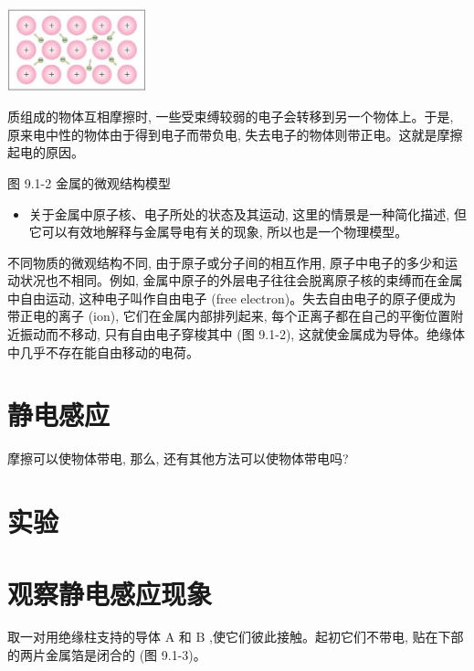 \documentclass[10pt]{article}
\begin{document}
\begin{mdframed}

\begin{center}
\includegraphics[max width=0.3\textwidth]{images/01911d5f-8e38-70c0-b5b8-2b399bd115b6_8_950329.jpg}
\end{center}

质组成的物体互相摩擦时, 一些受束缚较弱的电子会转移到另一个物体上。于是, 原来电中性的物体由于得到电子而带负电, 失去电子的物体则带正电。这就是摩擦起电的原因。

图 9.1-2 金属的微观结构模型

\begin{itemize}
\item 关于金属中原子核、电子所处的状态及其运动, 这里的情景是一种简化描述, 但它可以有效地解释与金属导电有关的现象, 所以也是一个物理模型。
\end{itemize}

\end{mdframed}

不同物质的微观结构不同, 由于原子或分子间的相互作用, 原子中电子的多少和运动状况也不相同。例如, 金属中原子的外层电子往往会脱离原子核的束缚而在金属中自由运动, 这种电子叫作自由电子 (free electron)。失去自由电子的原子便成为带正电的离子 (ion), 它们在金属内部排列起来, 每个正离子都在自己的平衡位置附近振动而不移动, 只有自由电子穿梭其中 (图 9.1-2), 这就使金属成为导体。绝缘体中几乎不存在能自由移动的电荷。

\section*{静电感应}

摩擦可以使物体带电, 那么, 还有其他方法可以使物体带电吗?

\section*{实验}

\section*{观察静电感应现象}

取一对用绝缘柱支持的导体 \(\mathrm{A}\) 和 \(\mathrm{B}\) ,使它们彼此接触。起初它们不带电, 贴在下部的两片金属箔是闭合的 (图 9.1-3)。
\end{document}

